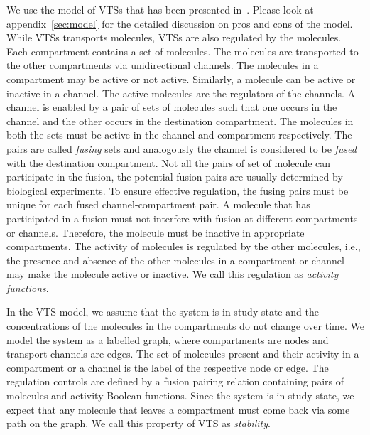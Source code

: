We use the model of VTSs that has been presented in~\cite{VTS}.
%
Please look at appendix~\ref{sec:model}
for the detailed discussion on pros and cons of the model.
While VTSs transports molecules, VTSs are also
regulated by the molecules.
%
Each compartment contains a set of molecules.
%
The molecules are transported to the other compartments via
unidirectional channels.  
%
The molecules in a compartment may be active or not active.
%
Similarly, a molecule can be active or inactive in a channel. 
%
The active molecules are the regulators of the channels.
%
A channel is enabled by a pair of sets of molecules
such that one occurs in the channel and the other
occurs in the destination compartment.
%
The molecules in both the sets must be active in the channel
and compartment respectively.
%
The pairs are called {\em fusing} sets and analogously
the channel is considered to be {\em fused} with the
destination compartment.
%
Not all the pairs of set of molecule can participate in the fusion, the
potential fusion pairs are usually determined by biological experiments.
%
To ensure effective regulation, the fusing pairs must be
unique for each fused channel-compartment pair.
%
A molecule that has participated in a fusion must not interfere
with fusion at different compartments or channels.
%
Therefore, the molecule must be inactive in appropriate compartments.
%
The activity of molecules is regulated by the other molecules, i.e.,
the presence and absence of the other molecules in a compartment or
channel may make the molecule active or inactive.
%
We call this regulation as {\em activity functions}.

%
In the VTS model, we assume that the system is in study state and the
concentrations of the molecules in the compartments do not change over
time.
%
We model the system as a labelled graph, where compartments are nodes and
transport channels are edges.
%
The set of molecules present and their activity in a compartment or
a channel is the label of the respective node or edge.
%
The regulation controls are defined by a fusion pairing relation
containing pairs of molecules and activity
Boolean functions.
%
Since the system is in study state, we expect that any molecule that
leaves a compartment must come back via some path on the graph.
%
We call this property of VTS as {\em stability}.

